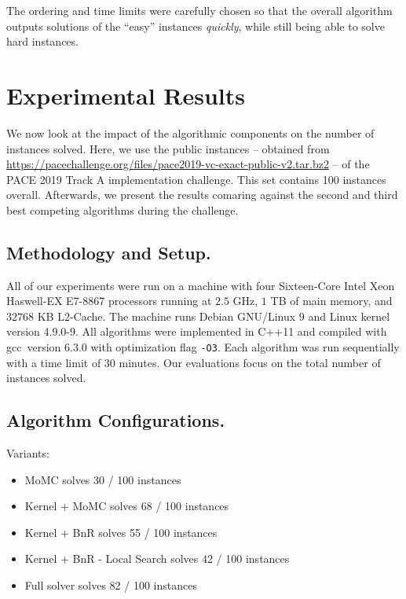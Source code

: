 \documentclass[twoside,leqno,twocolumn]{article}
\begin{document}
The ordering and time limits were carefully chosen so that the overall algorithm outputs solutions of the ``easy'' instances \emph{quickly}, while still being able to solve hard instances.
\vfill\pagebreak
\section{Experimental Results}
We now look at the impact of the algorithmic components on the number of instances solved.
Here, we use the public instances -- obtained from \url{https://pacechallenge.org/files/pace2019-vc-exact-public-v2.tar.bz2} -- of the PACE 2019 Track A implementation challenge. This set contains 100 instances overall. Afterwards, we present the results comaring against the second and third best competing algorithms during the challenge. 

\subsection{Methodology and Setup.}
All of our experiments were run on a machine with  four Sixteen-Core Intel Xeon Haswell-EX E7-8867 processors running at $2.5$ GHz, $1$ TB of main memory, and $32768$ KB L2-Cache.
The machine runs Debian GNU/Linux 9 and Linux kernel version 4.9.0-9.
All algorithms were implemented in C++11 and compiled with gcc~version 6.3.0 with optimization flag \texttt{-O3}.
Each algorithm was run sequentially with a time limit of 30 minutes. Our evaluations focus on the total number of instances solved.
\subsection{Algorithm Configurations.}
Variants:
\begin{itemize}
        \item MoMC solves 30 / 100 instances 
        \item Kernel + MoMC solves 68 / 100 instances 
        \item Kernel + BnR solves 55 / 100 instances 
        \item Kernel + BnR - Local Search solves 42 / 100 instances 
        \item Full solver solves 82 / 100 instances 
\end{itemize}

\end{document}
